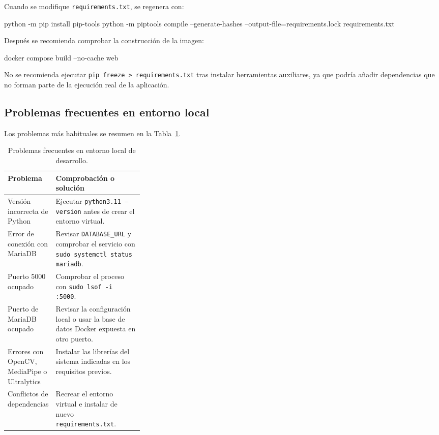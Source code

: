 Cuando se modifique \texttt{requirements.txt}, se regenera con:

\begin{bloqueTerminal}[title={Regeneración de requirements.lock}]
	python -m pip install pip-tools
	python -m piptools compile --generate-hashes --output-file=requirements.lock requirements.txt
\end{bloqueTerminal}

Después se recomienda comprobar la construcción de la imagen:

\begin{bloqueTerminal}[title={Comprobación de construcción Docker}]
	docker compose build --no-cache web
\end{bloqueTerminal}

No se recomienda ejecutar \texttt{pip freeze > requirements.txt} tras instalar herramientas auxiliares, ya que podría añadir dependencias que no forman parte de la ejecución real de la aplicación.

\subsection{Problemas frecuentes en entorno local}

Los problemas más habituales se resumen en la Tabla~\ref{tabla:problemas_frecuentes_programador}.

\begin{table}[H]
	\centering
	\small
	\renewcommand{\arraystretch}{1.15}
	\begin{tabularx}{\linewidth}{p{0.31\linewidth}X}
		\toprule
		\textbf{Problema} & \textbf{Comprobación o solución} \\
		\midrule
		Versión incorrecta de Python & Ejecutar \texttt{python3.11 --version} antes de crear el entorno virtual. \\
		Error de conexión con MariaDB & Revisar \texttt{DATABASE\_URL} y comprobar el servicio con \texttt{sudo systemctl status mariadb}. \\
		Puerto 5000 ocupado & Comprobar el proceso con \texttt{sudo lsof -i :5000}. \\
		Puerto de MariaDB ocupado & Revisar la configuración local o usar la base de datos Docker expuesta en otro puerto. \\
		Errores con OpenCV, MediaPipe o Ultralytics & Instalar las librerías del sistema indicadas en los requisitos previos. \\
		Conflictos de dependencias & Recrear el entorno virtual e instalar de nuevo \texttt{requirements.txt}. \\
		\bottomrule
	\end{tabularx}
	\caption[Problemas frecuentes en desarrollo]{Problemas frecuentes en entorno local de desarrollo.}
	\label{tabla:problemas_frecuentes_programador}
\end{table}

